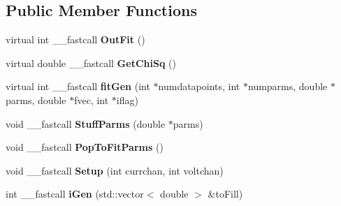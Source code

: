 \subsection*{Public Member Functions}
\begin{DoxyCompactItemize}
\item 
\hypertarget{class_t_h_h_current_model_ae198bcc354862e2cf7b0094da7288ec2}{virtual int \+\_\+\+\_\+fastcall {\bfseries Out\+Fit} ()}\label{class_t_h_h_current_model_ae198bcc354862e2cf7b0094da7288ec2}

\item 
\hypertarget{class_t_h_h_current_model_a4f95f6bb4f4fc3c78347f3794b3ab246}{virtual double \+\_\+\+\_\+fastcall {\bfseries Get\+Chi\+Sq} ()}\label{class_t_h_h_current_model_a4f95f6bb4f4fc3c78347f3794b3ab246}

\item 
\hypertarget{class_t_h_h_current_model_ae561975a3f295965ec98cce52a7d90a5}{virtual int \+\_\+\+\_\+fastcall {\bfseries fit\+Gen} (int $\ast$numdatapoints, int $\ast$numparms, double $\ast$parms, double $\ast$fvec, int $\ast$iflag)}\label{class_t_h_h_current_model_ae561975a3f295965ec98cce52a7d90a5}

\item 
\hypertarget{class_t_h_h_current_model_aa0c6d4dd0c86cd1ba2272e43993e452d}{void \+\_\+\+\_\+fastcall {\bfseries Stuff\+Parms} (double $\ast$parms)}\label{class_t_h_h_current_model_aa0c6d4dd0c86cd1ba2272e43993e452d}

\item 
\hypertarget{class_t_h_h_current_model_aeff8b76dd51218f92ce08e22a3956631}{void \+\_\+\+\_\+fastcall {\bfseries Pop\+To\+Fit\+Parms} ()}\label{class_t_h_h_current_model_aeff8b76dd51218f92ce08e22a3956631}

\item 
\hypertarget{class_t_h_h_current_model_a00edf58566894d52aaaadad98d28c075}{void \+\_\+\+\_\+fastcall {\bfseries Setup} (int currchan, int voltchan)}\label{class_t_h_h_current_model_a00edf58566894d52aaaadad98d28c075}

\item 
\hypertarget{class_t_h_h_current_model_add870dba1a7d86a9031f72ed8a7653f1}{int \+\_\+\+\_\+fastcall {\bfseries i\+Gen} (std\+::vector$<$ double $>$ \&to\+Fill)}\label{class_t_h_h_current_model_add870dba1a7d86a9031f72ed8a7653f1}

\end{DoxyCompactItemize}
